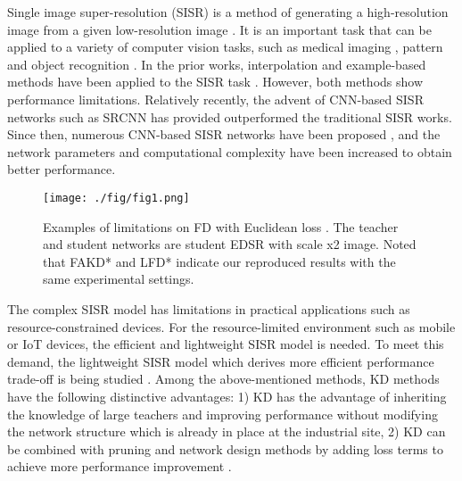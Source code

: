 \documentclass[10pt,twocolumn,letterpaper]{article}
\begin{document}
Single image super-resolution (SISR) is a method of generating a high-resolution image from a given low-resolution image \cite{sr}. It is an important task that can be applied to a variety of computer vision tasks, such as medical imaging \cite{medical_image_2}, pattern and object recognition \cite{detection_kd, multimedia_1}. In the prior works, interpolation and example-based methods have been applied to the SISR task \cite{rep_based_2, rep_based, interpolation}. However, both methods show performance limitations. Relatively recently, the advent of CNN-based SISR networks such as SRCNN \cite{srcnn} has provided outperformed the traditional SISR works. Since then, numerous CNN-based SISR networks have been proposed \cite{sr, vdsr, drcn}, and the network parameters and computational complexity have been increased to obtain better performance. 

\begin{figure}
\centering
\texttt{[image: ./fig/fig1.png]}
\caption{Examples of limitations on FD with Euclidean loss \cite{fakd, lsfd}. The teacher and student networks are student EDSR \cite{edsr2} with scale x2 image. Noted that FAKD* and LFD* indicate our reproduced results with the same experimental settings. \label{figure_0}}
\end{figure}


The complex SISR model has limitations in practical applications such as resource-constrained devices. For the resource-limited environment such as mobile or IoT devices, the efficient and lightweight SISR model is needed. To meet this demand, the lightweight SISR model which derives more efficient performance trade-off is being studied \cite{fakd,f_pruning2, ncnet, lsfd, csd2021, f_pruning,assl, srp}. Among the above-mentioned methods, KD \cite{kd} methods have the following distinctive advantages: 1) KD has the advantage of inheriting the knowledge of large teachers and improving performance without modifying the network structure which is already in place at the industrial site, 2) KD can be combined with pruning and network design methods by adding loss terms to achieve more performance improvement \cite{combine, pqk}.
\end{document}
